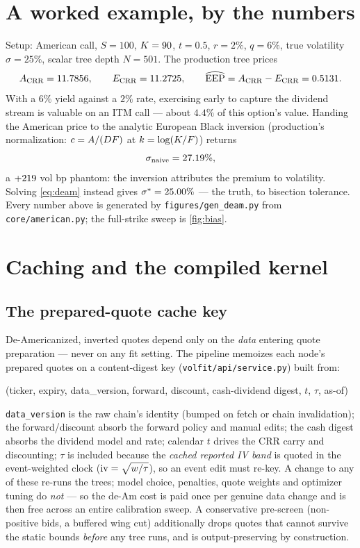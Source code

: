 \documentclass[11pt]{article}
\begin{document}
\section{A worked example, by the numbers}
\label{sec:example}

\begin{example}[title={Case file: one strike of \cref{fig:bias}}]
Setup: American call, $S=100$, $K=90$, $t=0.5$, $r=2\%$, $q=6\%$,
true volatility $\sigma=25\%$, scalar tree depth $N=501$. The production tree
prices
\[
A_{\mathrm{CRR}}=11.7856,\qquad
E_{\mathrm{CRR}}=11.2725,\qquad
\widehat{\mathrm{EEP}}=A_{\mathrm{CRR}}-E_{\mathrm{CRR}}=0.5131 .
\]
With a $6\%$ yield against a $2\%$ rate, exercising early to capture the
dividend stream is valuable on an ITM call --- about $4.4\%$ of this option's
value. Handing the American price to the analytic European Black inversion
(production's normalization: $c=A/(DF)$ at $k=\log(K/F)$) returns
\[
\sigma_{\text{naive}}=27.19\%,
\]
a $+219$ vol bp phantom: the inversion attributes the premium to
volatility. Solving \cref{eq:deam} instead gives
$\sigma^*=25.00\%$ --- the truth, to bisection tolerance. Every number
above is generated by \texttt{figures/gen\_deam.py} from
\texttt{core/american.py}; the full-strike sweep is \cref{fig:bias}.
\end{example}

\section{Caching and the compiled kernel}
\label{sec:cache}

\subsection{The prepared-quote cache key}

De-Americanized, inverted quotes depend only on the \emph{data} entering quote
preparation --- never on any fit setting. The pipeline memoizes each node's
prepared quotes on a content-digest key (\texttt{volfit/api/service.py}) built
from:
\begin{center}
\ttfamily\small
(ticker, expiry, data\_version, forward, discount, cash-dividend digest,
$t$, $\tau$, as-of)
\end{center}
\texttt{data\_version} is the raw chain's identity (bumped on fetch or chain
invalidation); the forward/discount absorb the forward policy and manual edits;
the cash digest absorbs the dividend model and rate; calendar $t$ drives the
CRR carry and discounting; $\tau$ is included because the \emph{cached reported
IV band} is quoted in the event-weighted clock ($\text{iv}=\sqrt{w/\tau}$),
so an event edit must re-key. A change to any of these re-runs the trees;
model choice, penalties, quote weights and optimizer tuning do \emph{not} ---
so the de-Am cost is paid once per genuine data change and is then free across
an entire calibration sweep. A conservative pre-screen (non-positive bids, a
buffered wing cut) additionally drops quotes that cannot survive the static
bounds \emph{before} any tree runs, and is output-preserving by construction.
\end{document}

